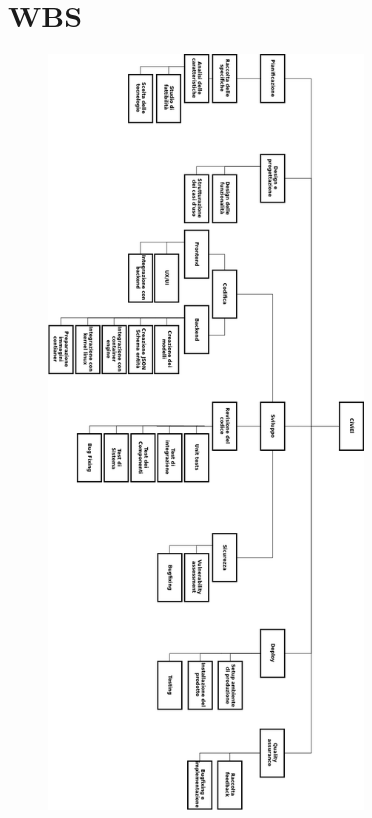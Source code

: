 \documentclass[../main.tex]{subfiles}
\begin{document}
\section{WBS}
\begin{figure}[H]
    \center
    \includegraphics[height=20cm]{capitoli/wbs.png}
\end{figure}
\clearpage
\end{document}
